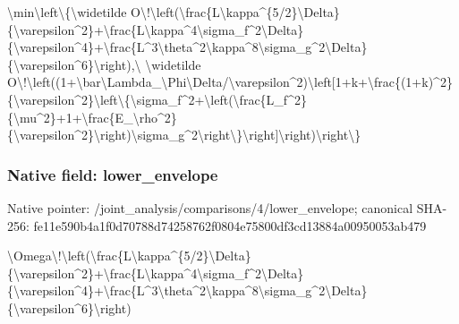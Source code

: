 \documentclass[10pt,a4paper]{article}
\begin{document}
\textbackslash{}min\textbackslash{}left\textbackslash{}\{\textbackslash{}widetilde O\textbackslash{}!\textbackslash{}left(\textbackslash{}frac\{L\textbackslash{}kappa\textasciicircum{}\{\allowbreak{}5/2\}\textbackslash{}Delta\}\{\textbackslash{}varepsilon\textasciicircum{}\allowbreak{}2\}+\textbackslash{}frac\{L\textbackslash{}kappa\textasciicircum{}4\textbackslash{}sigma\allowbreak{}\_f\textasciicircum{}2\textbackslash{}Delta\}\{\textbackslash{}varepsilon\textasciicircum{}\allowbreak{}4\}+\textbackslash{}frac\{L\textasciicircum{}3\textbackslash{}theta\textasciicircum{}2\textbackslash{}kap\allowbreak{}pa\textasciicircum{}8\textbackslash{}sigma\_g\textasciicircum{}2\textbackslash{}Delta\}\{\textbackslash{}v\allowbreak{}arepsilon\textasciicircum{}6\}\textbackslash{}right),\textbackslash{} \textbackslash{}widetilde O\textbackslash{}!\textbackslash{}left((1+\textbackslash{}bar\textbackslash{}Lambda\_\allowbreak{}\textbackslash{}Phi\textbackslash{}Delta/\textbackslash{}varepsilon\textasciicircum{}2\allowbreak{})\textbackslash{}left[1+k+\textbackslash{}frac\{(1+k)\textasciicircum{}2\allowbreak{}\}\{\textbackslash{}varepsilon\textasciicircum{}2\}\textbackslash{}left\textbackslash{}\{\textbackslash{}\allowbreak{}sigma\_f\textasciicircum{}2+\textbackslash{}left(\textbackslash{}frac\{L\_\allowbreak{}f\textasciicircum{}2\}\{\textbackslash{}mu\textasciicircum{}2\}+1+\textbackslash{}frac\{E\_\textbackslash{}r\allowbreak{}ho\textasciicircum{}2\}\{\textbackslash{}varepsilon\textasciicircum{}2\}\textbackslash{}rig\allowbreak{}ht)\textbackslash{}sigma\_g\textasciicircum{}2\textbackslash{}right\textbackslash{}\}\textbackslash{}ri\allowbreak{}ght]\textbackslash{}right)\textbackslash{}right\textbackslash{}\}


\subsubsection{Native field: lower\_envelope}


Native pointer: /joint\_analysis/comparis\allowbreak{}ons/4/lower\_envelope; canonical SHA-256: fe11e590b4a1f0d70788d742\allowbreak{}58762f0804e75800df3cd138\allowbreak{}84a00950053ab479


\textbackslash{}Omega\textbackslash{}!\textbackslash{}left(\textbackslash{}frac\{L\textbackslash{}ka\allowbreak{}ppa\textasciicircum{}\{5/2\}\textbackslash{}Delta\}\{\textbackslash{}vareps\allowbreak{}ilon\textasciicircum{}2\}+\textbackslash{}frac\{L\textbackslash{}kappa\textasciicircum{}4\textbackslash{}\allowbreak{}sigma\_f\textasciicircum{}2\textbackslash{}Delta\}\{\textbackslash{}vareps\allowbreak{}ilon\textasciicircum{}4\}+\textbackslash{}frac\{L\textasciicircum{}3\textbackslash{}theta\textasciicircum{}\allowbreak{}2\textbackslash{}kappa\textasciicircum{}8\textbackslash{}sigma\_g\textasciicircum{}2\textbackslash{}Delt\allowbreak{}a\}\{\textbackslash{}varepsilon\textasciicircum{}6\}\textbackslash{}right)
\end{document}

